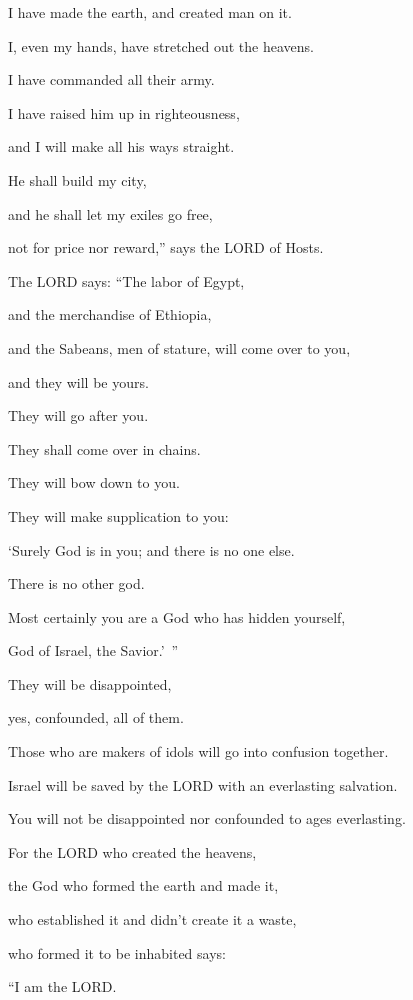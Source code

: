 \myverse{}I have made the earth, and created man on it.

I, even my hands, have stretched out the heavens.

I have commanded all their army.

\myverse{}I have raised him up in righteousness,

and I will make all his ways straight.

He shall build my city,

and he shall let my exiles go free,

not for price nor reward,” says the LORD of Hosts.


\vspace{\baselineskip} \myverse{}The LORD says: “The labor of Egypt,

and the merchandise of Ethiopia,

and the Sabeans, men of stature, will come over to you,

and they will be yours.

They will go after you.

They shall come over in chains.

They will bow down to you.

They will make supplication to you:

‘Surely God is in you; and there is no one else.

There is no other god.

\myverse{}Most certainly you are a God who has hidden yourself,

God of Israel, the Savior.’ ”

\myverse{}They will be disappointed,

yes, confounded, all of them.

Those who are makers of idols will go into confusion together.

\myverse{}Israel will be saved by the LORD with an everlasting salvation.

You will not be disappointed nor confounded to ages everlasting.


\vspace{\baselineskip} \myverse{}For the LORD who created the heavens,

the God who formed the earth and made it,

who established it and didn’t create it a waste,

who formed it to be inhabited says:

“I am the LORD.

